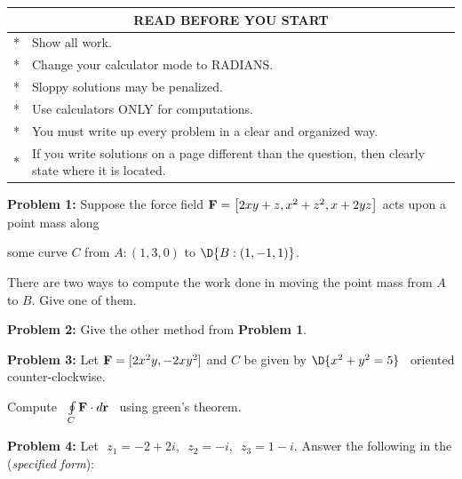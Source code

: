 \documentclass[12pt]{amsart}
\numberwithin{equation}{section}
\begin{document}
\begin{center}
	{\setlength{\extrarowheight}{0.2cm}
	\begin{tabular}{| cp{16cm} |}
		\hline
		\multicolumn{2}{|c|}{{\bf READ BEFORE YOU START}} \\
		\hline
		 * & Show all work.\\
		 * & Change your calculator mode to RADIANS.\\
		 * & Sloppy solutions may be penalized.\\
		 * & Use calculators ONLY for computations.\\
		 * & You must write up every problem in a clear and organized way.\\
		 * & If you write solutions on a page different than the question, then clearly state where it is located.\\
		\hline
	\end{tabular}}

\end{center}

\vspace{1.0cm}

\thispagestyle{empty}
\newpage
\thispagestyle{empty}

{\bf Problem 1:} Suppose the force field ${\bf F} = \left[2xy+z, x^2+z^2, x+2yz\right]$ acts upon a point mass along  

some curve $C$ from $A:(1,3,0)$ to $\D{B:\left(1,-1,1\right)}$.

\vspace{0.2cm}

There are two ways to compute the work done in moving the point mass from $A$ to $B$.  Give one of them.

\thispagestyle{empty}
\newpage
\thispagestyle{empty}

{\bf Problem 2:} Give the other method from {\bf Problem 1}.

\thispagestyle{empty}
\newpage
\thispagestyle{empty}

{\bf Problem 3:} Let $\text{\bf F} = [2x^2y,-2xy^2]$ and $C$ be given by $\D{x^2+y^2=5}$ \, oriented counter-clockwise.

Compute \, ${\oint \limits_{C} \text{\bf F}\cdot d\text{\bf r}}$ \, using green's theorem.\\

\thispagestyle{empty}
\newpage
\thispagestyle{empty}

{\bf Problem 4:} Let \,\,$z_1 = -2+2i$,\,\, $z_2 = -i$,\,\, $z_3 = 1-i$. \quad Answer the following in the ({\em specified form}):

\vspace{0.2cm}
\end{document}
